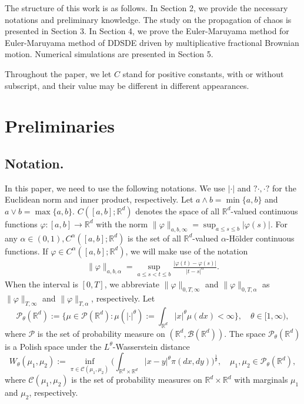 \documentclass[12pt]{article}
\newcommand{\ra}{\rightarrow}
\def\R{\mathbb R}
\def\B{\mathscr B}
\numberwithin{equation}{section}
\begin{document}
	The structure of this work is as follows. In Section 2, we provide the necessary notations and preliminary knowledge. The study on the propagation of chaos is presented in Section 3. In Section 4, we prove the Euler-Maruyama method for Euler-Maruyama method of DDSDE driven by multiplicative fractional Brownian motion. Numerical simulations are presented in Section 5.
	
	Throughout the paper, we let $C$ stand for positive constants, with or without
	subscript, and their value may be different in different appearances.
	
	
	\section{Preliminaries}
	\subsection{Notation.} In this paper, we need to use the following notations.
	We use $|\cdot|$ and $?\cdot, \cdot?$ for the Euclidean norm and inner product, respectively. Let $a \wedge b = \min\{a, b\}$ and $a \vee b = \max\{a, b\}$.
	$C([a,b];\R^d)$ denotes the space of all $\R^d$-valued continuous functions $\varphi:[a,b]\ra\R^d$ with the norm
	$\|\varphi\|_{a,b,\infty}=\sup_{a\leq s\leq b}|\varphi(s)|.$
	For any $\alpha\in(0,1), C^\alpha([a,b];\R^d)$ is the set of all $\R^d$-valued $\alpha$-H\"{o}lder continuous functions.
	If $\varphi\in C^\alpha([a,b];\R^d)$, we will make use of the notation
	\begin{align}\label{In8}
		\|\varphi\|_{a,b,\alpha}=\sup\limits_{a\leq s<t\leq b}\frac{|\varphi(t)-\varphi(s)|}{|t-s|^\alpha}.
	\end{align}
	When the interval is $[0,T]$, we abbreviate $\|\varphi\|_{0,T,\infty}$ and $\|\varphi\|_{0,T,\alpha}$ as $\|\varphi\|_{T,\infty}$ and $\|\varphi\|_{T,\alpha}$, respectively.
	Let $$\mathscr{P}_{\theta}(\mathbb{R}^{d}):=\Big\{\mu\in{\mathscr{P}}(\mathbb{R}^{d}):\mu(|\cdot|^{\theta}):=
	\int_{\mathbb{R}^{d}}|x|^{\theta}\mu(dx)<\infty\Big\},\quad \theta\in[1,\infty),$$
	where ${\mathscr{P}}$ is the set of probability measure on $(\mathbb{R}^{d},\B(\mathbb{R}^{d}))$. The space $\mathscr{P}_{\theta}(\mathbb{R}^{d})$ is a Polish space under the $L^{\theta}$-Wasserstein distance
	$${W}_{\theta}(\mu_{1},\mu_{2}):=\inf_{\pi\in\mathscr{C}(\mu_{1},\mu_{2})}\Big(\int_{\mathbb{R}^{d}
		\times\mathbb{R}^{d}}|x-y|^{\theta}\pi(dx,dy)\Big)^{\frac{1}{\theta}},\quad \mu_{1},\mu_{2}\in\mathscr{P}_{\theta}(\mathbb{R}^{d}),$$
	where $\mathscr{C}(\mu_{1},\mu_{2})$ is the set of probability measures on $\mathbb{R}^{d}\times\mathbb{R}^{d}$ with marginals $\mu_{1}$ and $\mu_{2}$, respectively.
	
\end{document}
